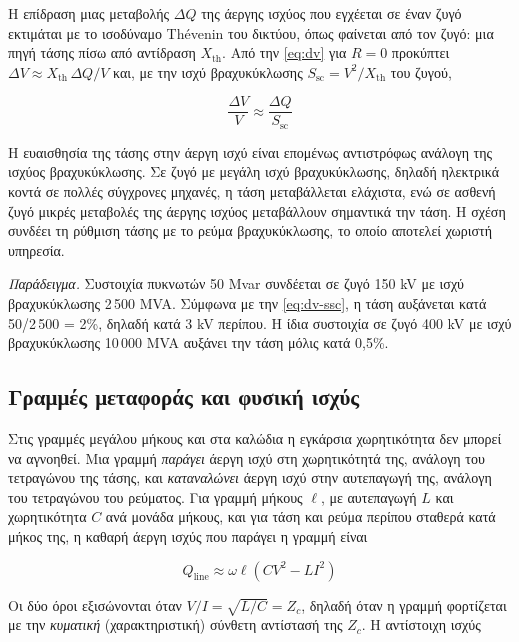 Η επίδραση μιας μεταβολής $\Delta Q$ της άεργης ισχύος που εγχέεται σε έναν ζυγό εκτιμάται με
το ισοδύναμο Thévenin του δικτύου, όπως φαίνεται από τον ζυγό: μια πηγή τάσης πίσω από
αντίδραση $X_{\mathrm{th}}$. Από την \eqref{eq:dv} για $R = 0$ προκύπτει
$\Delta V \approx X_{\mathrm{th}}\,\Delta Q / V$ και, με την ισχύ βραχυκύκλωσης
$S_{\mathrm{sc}} = V^2 / X_{\mathrm{th}}$ του ζυγού,

\begin{equation}
\frac{\Delta V}{V} \approx \frac{\Delta Q}{S_{\mathrm{sc}}}
\label{eq:dv-ssc}
\end{equation}

Η ευαισθησία της τάσης στην άεργη ισχύ είναι επομένως αντιστρόφως ανάλογη της ισχύος
βραχυκύκλωσης. Σε ζυγό με μεγάλη ισχύ βραχυκύκλωσης, δηλαδή ηλεκτρικά κοντά σε πολλές
σύγχρονες μηχανές, η τάση μεταβάλλεται ελάχιστα, ενώ σε ασθενή ζυγό μικρές μεταβολές της
άεργης ισχύος μεταβάλλουν σημαντικά την τάση. Η σχέση συνδέει τη ρύθμιση τάσης με το ρεύμα
βραχυκύκλωσης, το οποίο αποτελεί χωριστή υπηρεσία.

\emph{Παράδειγμα.} Συστοιχία πυκνωτών 50 Mvar συνδέεται σε ζυγό 150 kV με ισχύ
βραχυκύκλωσης 2\,500 MVA. Σύμφωνα με την \eqref{eq:dv-ssc}, η τάση αυξάνεται κατά
50/2\,500 = 2\%, δηλαδή κατά 3 kV περίπου. Η ίδια συστοιχία σε ζυγό 400 kV με ισχύ
βραχυκύκλωσης 10\,000 MVA αυξάνει την τάση μόλις κατά 0,5\%.

\subsection{Γραμμές μεταφοράς και φυσική ισχύς}
\label{sec:sil}

Στις γραμμές μεγάλου μήκους και στα καλώδια η εγκάρσια χωρητικότητα δεν μπορεί να αγνοηθεί.
Μια γραμμή \emph{παράγει} άεργη ισχύ στη χωρητικότητά της, ανάλογη του τετραγώνου της τάσης,
και \emph{καταναλώνει} άεργη ισχύ στην αυτεπαγωγή της, ανάλογη του τετραγώνου του ρεύματος.
Για γραμμή μήκους $\ell$, με αυτεπαγωγή $L$ και χωρητικότητα $C$ ανά μονάδα μήκους, και για
τάση και ρεύμα περίπου σταθερά κατά μήκος της, η καθαρή άεργη ισχύς που παράγει η γραμμή είναι

\begin{equation}
Q_{\mathrm{line}} \approx \omega \ell \left( C V^2 - L I^2 \right)
\label{eq:qline}
\end{equation}

Οι δύο όροι εξισώνονται όταν $V/I = \sqrt{L/C} = Z_c$, δηλαδή όταν η γραμμή φορτίζεται με την
\emph{κυματική} (χαρακτηριστική) σύνθετη αντίστασή της $Z_c$. Η αντίστοιχη ισχύς

